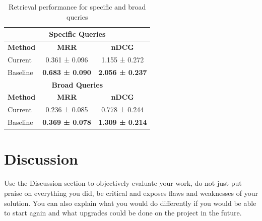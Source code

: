 \documentclass[fleqn,moreauthors,10pt]{ds_report}
\begin{document}
\begin{table}[h]
\centering
\caption{Retrieval performance for specific and broad queries}
\begin{tabular}{l|c|c}
\toprule
\multicolumn{3}{c}{\textbf{Specific Queries}} \\
\midrule
\textbf{Method} & \textbf{MRR} & \textbf{nDCG} \\
\midrule
Current  & 0.361 ± 0.096 & 1.155 ± 0.272 \\
Baseline & \textbf{0.683 ± 0.090} & \textbf{2.056 ± 0.237} \\
\midrule[0.8pt]
\multicolumn{3}{c}{\textbf{Broad Queries}} \\
\midrule
\textbf{Method} & \textbf{MRR} & \textbf{nDCG} \\
\midrule
Current  & 0.236 ± 0.085 & 0.778 ± 0.244 \\
Baseline & \textbf{0.369 ± 0.078} & \textbf{1.309 ± 0.214} \\
\bottomrule
\end{tabular}
\end{table}











\section*{Discussion}

Use the Discussion section to objectively evaluate your work, do not just put praise on everything you did, be critical and exposes flaws and weaknesses of your solution. You can also explain what you would do differently if you would be able to start again and what upgrades could be done on the project in the future.




\end{document}
